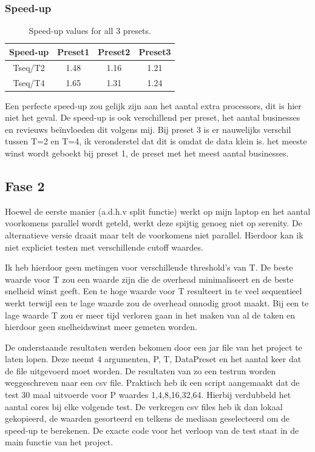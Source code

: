 \documentclass[]{article}
\begin{document}
\subsubsection{Speed-up}
\begin{table}[h!]
	\centering
	\begin{tabular}{|c|c|c|c|}
		\hline 
		Speed-up & Preset1 & Preset2 & Preset3 \\ 
		\hline 
		Tseq/T2 & 1.48 & 1.16 & 1.21 \\ 
		\hline 
		Tseq/T4 & 1.65 & 1.31 & 1.24 \\ 
		\hline 
	\end{tabular} 
	\caption{Speed-up values for all 3 presets.}
	\label{table:2}
\end{table}

Een perfecte speed-up zou gelijk zijn aan het aantal extra processors, dit is hier niet het geval.
De speed-up is ook verschillend per preset, het aantal businesses en revieuws beïnvloeden dit volgens mij.
Bij preset 3 is er nauwelijks verschil tussen T=2 en T=4, ik veronderstel dat dit is omdat de data klein is.
het meeste winst wordt geboekt bij preset 1, de preset met het meest aantal businesses.

\subsection{Fase 2}

Hoewel de eerste manier (a.d.h.v split functie) werkt op mijn laptop en het aantal voorkomens parallel wordt geteld, werkt deze spijtig genoeg niet op serenity. De alternatieve versie draait maar telt de voorkomens niet parallel. Hierdoor kan ik niet expliciet testen met verschillende cutoff waardes.

Ik heb hierdoor geen metingen voor verschillende threshold's van T. De beste waarde voor T zou een waarde zijn die de overhead minimaliseert en de beste snelheid winst geeft. Een te hoge waarde voor T resulteert in te veel sequentieel werkt terwijl een te lage waarde zou de overhead onnodig groot maakt. Bij een te lage waarde T zou er meer tijd verloren gaan in het maken van al de taken en hierdoor geen snelheidswinst meer gemeten worden.

De onderstaande resultaten werden bekomen door een jar file van het project te laten lopen. Deze neemt 4 argumenten, P, T, DataPreset en het aantal keer dat de file uitgevoerd moet worden. De resultaten van zo een testrun worden weggeschreven naar een csv file. Praktisch heb ik een script aangemaakt dat de test 30 maal uitvoerde voor P waardes 1,4,8,16,32,64. Hierbij verdubbeld het aantal cores bij elke volgende test.
De verkregen csv files heb ik dan lokaal gekopieerd, de waarden gesorteerd en telkens de mediaan geselecteerd om de speed-up te berekenen. De exacte code voor het verloop van de test staat in de main functie van het project. 
\end{document}
